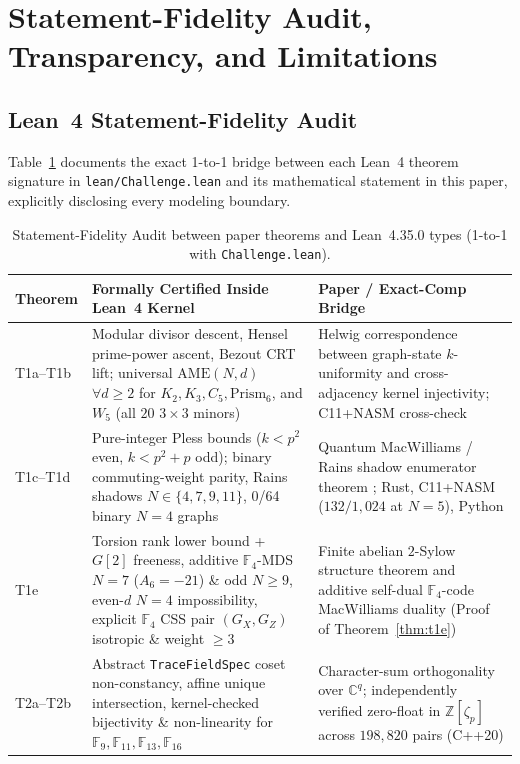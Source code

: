 \documentclass[11pt,reqno]{amsart}
\theoremstyle{definition}
\newcommand{\ZZ}{\mathbb{Z}}
\newcommand{\FF}{\mathbb{F}}
\newcommand{\CC}{\mathbb{C}}
\newcommand{\AME}{\mathrm{AME}}
\newcommand{\lid}[1]{{\footnotesize\nolinkurl{#1}}}
\begin{document}
\section{Statement-Fidelity Audit, Transparency, and Limitations}
\label{sec:audit}

\subsection{Lean~4 Statement-Fidelity Audit}
Table~\ref{tab:fidelity} documents the exact 1-to-1 bridge between each Lean~4 theorem
signature in \lid{lean/Challenge.lean} and its mathematical statement in this paper,
explicitly disclosing every modeling boundary.

\begin{table}[htbp]
\centering
\caption{Statement-Fidelity Audit between paper theorems and Lean~4.35.0 types (1-to-1 with \lid{Challenge.lean}).}
\label{tab:fidelity}
\scriptsize
\setlength{\tabcolsep}{4pt}
\begin{tabularx}{\textwidth}{@{}l >{\raggedright\arraybackslash}X >{\raggedright\arraybackslash}X@{}}
\toprule
\textbf{Theorem} & \textbf{Formally Certified Inside Lean~4 Kernel} & \textbf{Paper / Exact-Comp Bridge} \\
\midrule
T1a--T1b & Modular divisor descent, Hensel prime-power ascent, Bezout CRT lift; universal $\AME(N,d)$ $\forall d\ge 2$ for $K_2, K_3, C_5, \mathrm{Prism}_6$, and $W_5$ (all $20$ $3\times 3$ minors) & Helwig \cite{helwig2013ame} correspondence between graph-state $k$-uniformity and cross-adjacency kernel injectivity; C11+NASM cross-check \\
T1c--T1d & Pure-integer Pless bounds ($k < p^2$ even, $k < p^2+p$ odd); binary commuting-weight parity, Rains shadows $N \in \{4,7,9,11\}$, 0/64 binary $N=4$ graphs & Quantum MacWilliams / Rains shadow enumerator theorem \cite{rains1998shadow}; Rust, C11+NASM ($132/1{,}024$ at $N=5$), Python \\
T1e & Torsion rank lower bound + $G[2]$ freeness, additive $\FF_4$-MDS $N=7$ ($A_6=-21$) \& odd $N \ge 9$, even-$d$ $N=4$ impossibility, explicit $\FF_4$ CSS pair $(G_X, G_Z)$ isotropic \& weight $\ge 3$ & Finite abelian $2$-Sylow structure theorem and additive self-dual $\FF_4$-code MacWilliams duality (Proof of Theorem~\ref{thm:t1e}) \\
T2a--T2b & Abstract \lid{TraceFieldSpec} coset non-constancy, affine unique intersection, kernel-checked bijectivity \& non-linearity for $\FF_9, \FF_{11}, \FF_{13}, \FF_{16}$ & Character-sum orthogonality over $\CC^q$; independently verified zero-float in $\ZZ[\zeta_p]$ across $198{,}820$ pairs (C++20) \\

\end{tabularx}
\end{table}
\end{document}
